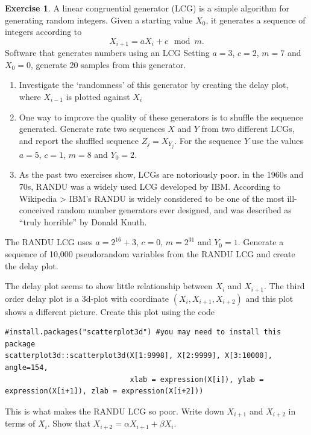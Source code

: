 \documentclass[
]{book}
\theoremstyle{definition}
\theoremstyle{definition}
\theoremstyle{definition}
\newtheorem{exercise}{Exercise}[chapter]
\theoremstyle{definition}
\theoremstyle{remark}
\begin{document}
\begin{exercise}

A linear congruential generator (LCG) is a simple algorithm for generating random integers. Given a starting value \(X_0\), it generates a sequence of integers according to
\[
X_{i+1} = a X_i + c \mod m.
\]
Software that generates numbers using an LCG Setting \(a = 3\), \(c = 2\), \(m = 7\) and \(X_0 = 0\), generate 20 samples from this generator.

\begin{enumerate}
\def\labelenumi{\arabic{enumi}.}
\item
  Investigate the `randomness' of this generator by creating the delay plot, where \(X_{i-1}\) is plotted against \(X_{i}\)
\item
  One way to improve the quality of these generators is to shuffle the sequence generated. Generate rate two sequences \(X\) and \(Y\) from two different LCGs, and report the shuffled sequence \(Z_j = X_{Y_j}\). For the sequence \(Y\) use the values \(a = 5\), \(c = 1\), \(m = 8\) and \(Y_0 = 2\).
\item
  As the past two exercises show, LCGs are notoriously poor. in the 1960s and 70s, RANDU was a widely used LCG developed by IBM. According to Wikipedia
  \textgreater{} IBM's RANDU is widely considered to be one of the most ill-conceived random number generators ever designed, and was described as ``truly horrible'' by Donald Knuth.
\end{enumerate}

The RANDU LCG uses \(a = 2^{16} + 3\), \(c = 0\), \(m = 2^{31}\) and \(Y_0 = 1\). Generate a sequence of 10,000 pseudorandom variables from the RANDU LCG and create the delay plot.

The delay plot seems to show little relationship between \(X_{i}\) and \(X_{i+1}\). The third order delay plot is a 3d-plot with coordinate \((X_i, X_{i+1}, X_{i+2})\) and this plot shows a different picture. Create this plot using the code

\begin{verbatim}
#install.packages("scatterplot3d") #you may need to install this package
scatterplot3d::scatterplot3d(X[1:9998], X[2:9999], X[3:10000], angle=154, 
                             xlab = expression(X[i]), ylab = expression(X[i+1]), zlab = expression(X[i+2]))
\end{verbatim}

This is what makes the RANDU LCG so poor. Write down \(X_{i+1}\) and \(X_{i+2}\) in terms of \(X_i\). Show that \(X_{i+2} = \alpha X_{i+1} + \beta X_{i}\).


\end{exercise}
\end{document}
